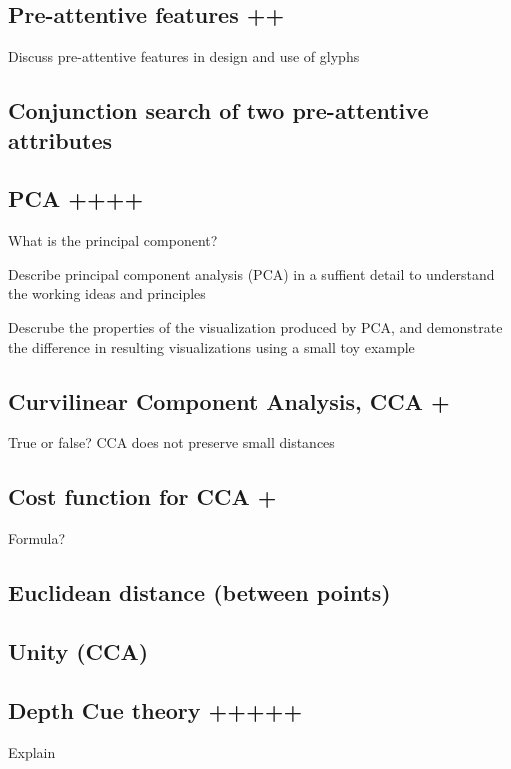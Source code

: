 \documentclass[a4paper]{article}
\begin{document}
\subsection{Pre-attentive features ++}



Discuss pre-attentive features in design and use of glyphs

\subsection{Conjunction search of two pre-attentive attributes}

\subsection{PCA ++++}

What is the principal component?

Describe principal component analysis (PCA) in a suffient detail to understand the working ideas and principles

Descrube the properties of the visualization produced by PCA, and demonstrate the difference in resulting visualizations using a small toy example

\subsection{Curvilinear Component Analysis, CCA +}

True or false? CCA does not preserve small distances

\subsection{Cost function for CCA +}

Formula?

\subsection{Euclidean distance (between points)}

\subsection{Unity (CCA)}

\subsection{Depth Cue theory +++++}
Explain
\end{document}
